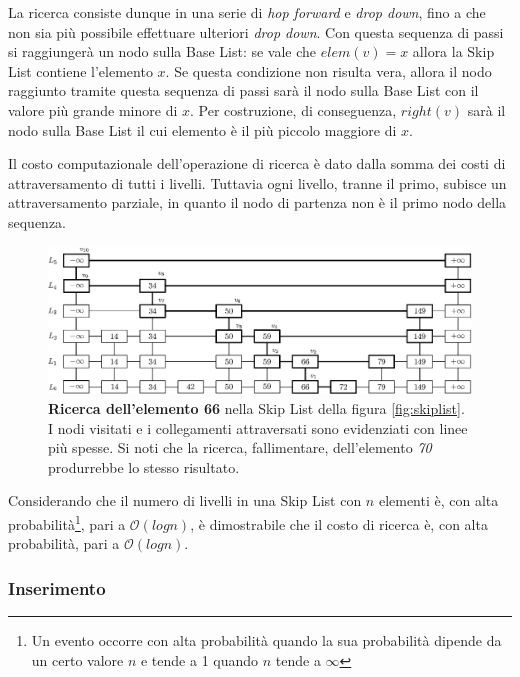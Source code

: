 			La ricerca consiste dunque in una serie di \textit{hop forward} e \textit{drop down}, fino a che non sia più possibile effettuare ulteriori \textit{drop down}. Con questa sequenza di passi si raggiungerà un nodo sulla Base List: se vale che $ elem(v) = x $ allora la Skip List contiene l'elemento $ x $. Se questa condizione non risulta vera, allora il nodo raggiunto tramite questa sequenza di passi sarà il nodo sulla Base List con il valore più grande minore di $ x $. Per costruzione, di conseguenza, $ right(v) $ sarà il nodo sulla Base List il cui elemento è il più piccolo maggiore di $ x $.
			
			Il costo computazionale dell'operazione di ricerca è dato dalla somma dei costi di attraversamento di tutti i livelli. Tuttavia ogni livello, tranne il primo, subisce un attraversamento parziale, in quanto il nodo di partenza non è il primo nodo della sequenza.
			
			
			\begin{figure}
				\centering
				\includegraphics[scale=0.6]{figure/search-66.eps}
				\caption{\textbf{Ricerca dell'elemento 66} nella Skip List della figura \ref{fig:skiplist}. I nodi visitati e i collegamenti attraversati sono evidenziati con linee più spesse. Si noti che la ricerca, fallimentare, dell'elemento \textit{70} produrrebbe lo stesso risultato.}\label{fig:2}
			\end{figure}
			
			Considerando che il numero di livelli in una Skip List con $ n $ elementi è, con alta probabilità\footnote{Un evento occorre con alta probabilità quando la sua probabilità dipende da un certo valore $ n $ e tende a 1 quando $ n $ tende a $\infty$}, pari a $\mathcal{O}(log{}n)$, è dimostrabile che il costo di ricerca è, con alta probabilità, pari a $\mathcal{O}(log{}n)$.
				
		\subsubsection{Inserimento}
		
